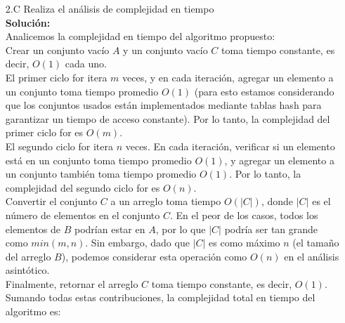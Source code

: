 \documentclass[12pt]{article}
\begin{document}
\begin{itemize}
    \item[2.C] Realiza el análisis de complejidad en tiempo\\
    \textbf{Solución:}\\
    Analicemos la complejidad en tiempo del algoritmo propuesto:\\
    Crear un conjunto vacío $A$ y un conjunto vacío $C$ toma tiempo constante, es decir, $O(1)$ cada uno.\\
    El primer ciclo for itera $m$ veces, y en cada iteración, agregar un elemento a un conjunto toma tiempo promedio $O(1)$ (para esto estamos considerando que los conjuntos usados están implementados mediante tablas hash para garantizar un tiempo de acceso constante). Por lo tanto, la complejidad del primer ciclo for es $O(m)$.\\
    El segundo ciclo for itera $n$ veces. En cada iteración, verificar si un elemento está en un conjunto toma tiempo promedio $O(1)$, y agregar un elemento a un conjunto también toma tiempo promedio $O(1)$. Por lo tanto, la complejidad del segundo ciclo for es $O(n)$.\\
    Convertir el conjunto $C$ a un arreglo toma tiempo $O(|C|)$, donde $|C|$ es el número de elementos en el conjunto $C$. En el peor de los casos, todos los elementos de $B$ podrían estar en $A$, por lo que $|C|$ podría ser tan grande como $min(m, n)$. Sin embargo, dado que $|C|$ es como máximo $n$ (el tamaño del arreglo $B$), podemos considerar esta operación como $O(n)$ en el análisis asintótico.\\
    Finalmente, retornar el arreglo $C$ toma tiempo constante, es decir, $O(1)$.\\
    Sumando todas estas contribuciones, la complejidad total en tiempo del algoritmo es:


\end{itemize}
\end{document}
